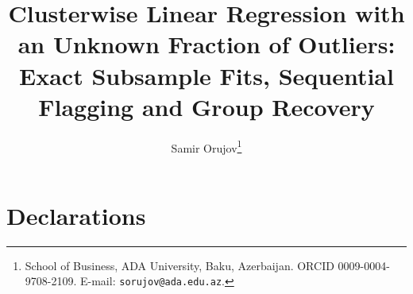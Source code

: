 \documentclass[11pt]{article}
\title{Clusterwise Linear Regression with an Unknown Fraction of Outliers:\\
Exact Subsample Fits, Sequential Flagging and Group Recovery}
\author{Samir Orujov\thanks{School of Business, ADA University, Baku, Azerbaijan.
ORCID 0009-0004-9708-2109. E-mail: \texttt{sorujov@ada.edu.az}.}}
\date{}
\begin{document}
\maketitle









\section*{Declarations}






\end{document}

